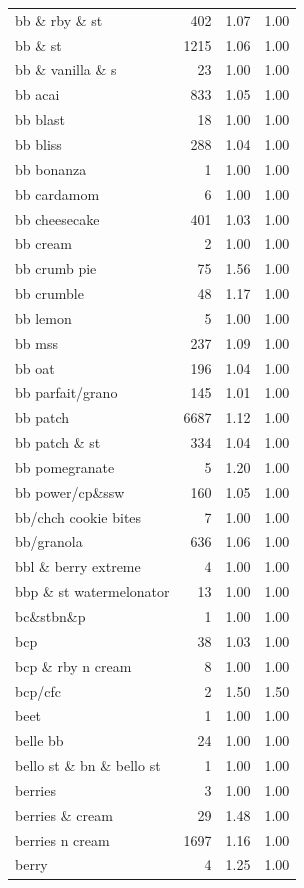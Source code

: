 \begin{table}
\begin{tabular}{lrrr}
bb \& rby \& st & 402 & 1.07 & 1.00 \\
bb \& st & 1215 & 1.06 & 1.00 \\
bb \& vanilla \& s & 23 & 1.00 & 1.00 \\
bb acai & 833 & 1.05 & 1.00 \\
bb blast & 18 & 1.00 & 1.00 \\
bb bliss & 288 & 1.04 & 1.00 \\
bb bonanza & 1 & 1.00 & 1.00 \\
bb cardamom & 6 & 1.00 & 1.00 \\
bb cheesecake & 401 & 1.03 & 1.00 \\
bb cream & 2 & 1.00 & 1.00 \\
bb crumb pie & 75 & 1.56 & 1.00 \\
bb crumble & 48 & 1.17 & 1.00 \\
bb lemon & 5 & 1.00 & 1.00 \\
bb mss & 237 & 1.09 & 1.00 \\
bb oat & 196 & 1.04 & 1.00 \\
bb parfait/grano & 145 & 1.01 & 1.00 \\
bb patch & 6687 & 1.12 & 1.00 \\
bb patch \& st & 334 & 1.04 & 1.00 \\
bb pomegranate & 5 & 1.20 & 1.00 \\
bb power/cp\&ssw & 160 & 1.05 & 1.00 \\
bb/chch cookie bites & 7 & 1.00 & 1.00 \\
bb/granola & 636 & 1.06 & 1.00 \\
bbl \& berry extreme & 4 & 1.00 & 1.00 \\
bbp \& st watermelonator & 13 & 1.00 & 1.00 \\
bc\&stbn\&p & 1 & 1.00 & 1.00 \\
bcp & 38 & 1.03 & 1.00 \\
bcp \& rby n cream & 8 & 1.00 & 1.00 \\
bcp/cfc & 2 & 1.50 & 1.50 \\
beet & 1 & 1.00 & 1.00 \\
belle bb & 24 & 1.00 & 1.00 \\
bello st \& bn \& bello st & 1 & 1.00 & 1.00 \\
berries & 3 & 1.00 & 1.00 \\
berries \& cream & 29 & 1.48 & 1.00 \\
berries n cream & 1697 & 1.16 & 1.00 \\
berry & 4 & 1.25 & 1.00 \\

\end{tabular}
\end{table}
